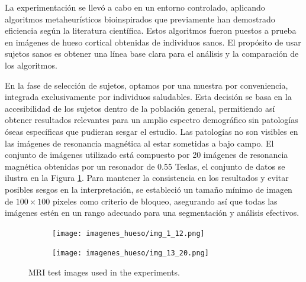 \documentclass[conference]{IEEEtran}
\begin{document}
\noindent La experimentación se llevó a cabo en un entorno controlado, aplicando algoritmos metaheurísticos bioinspirados que previamente han demostrado eficiencia según la literatura científica. Estos algoritmos fueron puestos a prueba en imágenes de hueso cortical obtenidas de individuos sanos. El propósito de usar sujetos sanos es obtener una línea base clara para el análisis y la comparación de los algoritmos.

\noindent En la fase de selección de sujetos, optamos por una muestra por conveniencia, integrada exclusivamente por individuos saludables. Esta decisión se basa en la accesibilidad de los sujetos dentro de la población general, permitiendo así obtener resultados relevantes para un amplio espectro demográfico sin patologías óseas específicas que pudieran sesgar el estudio. Las patologías no son visibles en las imágenes de resonancia magnética al estar sometidas a bajo campo. El conjunto de imágenes utilizado está compuesto por 20 imágenes de resonancia magnética obtenidas por un resonador de 0.55 Teslas, el conjunto de datos se ilustra en la Figura \ref{fig:imagenes}.
Para mantener la consistencia en los resultados y evitar posibles sesgos en la interpretación, se estableció un tamaño mínimo de imagen de $100\times100$ pixeles como criterio de bloqueo, asegurando así que todas las imágenes estén en un rango adecuado para una segmentación y análisis efectivos.

\begin{figure}
    \centering

    \begin{subfigure}{0.5\textwidth}
        \texttt{[image: imagenes\_hueso/img\_1\_12.png]}
    \end{subfigure}
    
    \begin{subfigure}{0.5\textwidth}
        \texttt{[image: imagenes\_hueso/img\_13\_20.png]}
    \end{subfigure}
    \caption{MRI test images used in the experiments.}
\label{fig:imagenes}    
\end{figure}


\end{document}
